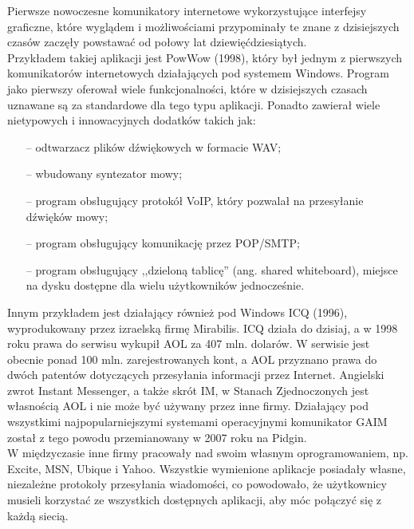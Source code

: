\documentclass[a4paper,12pt]{article}
\begin{document}
\par Pierwsze nowoczesne komunikatory internetowe wykorzystujące interfejsy graficzne, które wyglądem i możliwościami przypominały te znane z dzisiejszych czasów zaczęły powstawać od połowy lat dziewięćdziesiątych.\\
Przykładem takiej aplikacji jest PowWow (1998), który był jednym z pierwszych komunikatorów internetowych działających pod systemem Windows. Program jako pierwszy oferował wiele funkcjonalności, które w dzisiejszych czasach uznawane są za standardowe dla tego typu aplikacji. Ponadto zawierał wiele nietypowych i innowacyjnych dodatków takich jak:
\begin{itemize}
    \item[--] odtwarzacz plików dźwiękowych w formacie WAV;
    \item[--] wbudowany syntezator mowy;
    \item[--] program obsługujący protokół VoIP, który pozwalał na przesyłanie dźwięków mowy;
    \item[--] program obsługujący komunikację przez POP/SMTP;
    \item[--] program obsługujący ,,dzieloną tablicę'' (ang. shared whiteboard), miejsce na dysku dostępne dla wielu użytkowników jednocześnie.
\end{itemize} 
Innym przykładem jest działający również pod Windows ICQ (1996), wyprodukowany przez izraelską firmę Mirabilis. ICQ działa do dzisiaj, a w 1998 roku prawa do serwisu wykupił AOL za 407 mln. dolarów. W serwisie jest obecnie ponad 100 mln. zarejestrowanych kont, a AOL przyznano prawa do dwóch patentów dotyczących przesyłania informacji przez Internet. Angielski zwrot Instant Messenger, a także skrót IM, w Stanach Zjednoczonych jest własnością AOL i nie może być używany przez inne firmy. Działający pod wszystkimi najpopularniejszymi systemami operacyjnymi komunikator GAIM został z tego powodu przemianowany w 2007 roku na Pidgin.\\
W międzyczasie inne firmy pracowały nad swoim własnym oprogramowaniem, np. Excite, MSN, Ubique i Yahoo.
Wszystkie wymienione aplikacje posiadały własne, niezależne protokoły przesyłania wiadomości, co powodowało, że użytkownicy musieli korzystać ze wszystkich dostępnych aplikacji, aby móc połączyć się z każdą siecią.
\end{document}
